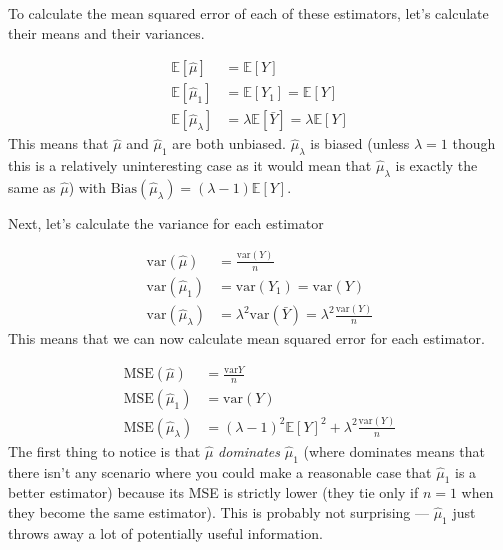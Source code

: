 \documentclass[
  letterpaper,
  DIV=11,
  numbers=noendperiod]{scrreprt}
\begin{document}
To calculate the mean squared error of each of these estimators, let's
calculate their means and their variances.

\[
  \begin{aligned}
    \mathbb{E}[\hat{\mu}] &= \mathbb{E}[Y] \\
    \mathbb{E}[\hat{\mu}_1] &= \mathbb{E}[Y_1] = \mathbb{E}[Y] \\
    \mathbb{E}[\hat{\mu}_\lambda] &= \lambda \mathbb{E}[\bar{Y}] = \lambda \mathbb{E}[Y]
  \end{aligned}
\] This means that \(\hat{\mu}\) and \(\hat{\mu}_1\) are both unbiased.
\(\hat{\mu}_\lambda\) is biased (unless \(\lambda=1\) though this is a
relatively uninteresting case as it would mean that
\(\hat{\mu}_\lambda\) is exactly the same as \(\hat{\mu}\)) with
\(\textrm{Bias}(\hat{\mu}_\lambda) = (\lambda - 1) \mathbb{E}[Y]\).

Next, let's calculate the variance for each estimator

\[
  \begin{aligned}
  \mathrm{var}(\hat{\mu}) &= \frac{\mathrm{var}(Y)}{n} \\
  \mathrm{var}(\hat{\mu}_1) &= \mathrm{var}(Y_1) = \mathrm{var}(Y) \\
  \mathrm{var}(\hat{\mu}_\lambda) &= \lambda^2 \mathrm{var}(\bar{Y}) = \lambda^2 \frac{\mathrm{var}(Y)}{n}
  \end{aligned}
\] This means that we can now calculate mean squared error for each
estimator.

\[
  \begin{aligned}
    \textrm{MSE}(\hat{\mu}) &= \frac{\mathrm{var}{Y}}{n} \\
    \textrm{MSE}(\hat{\mu}_1) &= \mathrm{var}(Y) \\
    \textrm{MSE}(\hat{\mu}_\lambda) &= (\lambda-1)^2\mathbb{E}[Y]^2 + \lambda^2 \frac{\mathrm{var}(Y)}{n}
  \end{aligned}
\] The first thing to notice is that \(\hat{\mu}\) \emph{dominates}
\(\hat{\mu}_1\) (where dominates means that there isn't any scenario
where you could make a reasonable case that \(\hat{\mu}_1\) is a better
estimator) because its MSE is strictly lower (they tie only if \(n=1\)
when they become the same estimator). This is probably not surprising
--- \(\hat{\mu}_1\) just throws away a lot of potentially useful
information.
\end{document}
